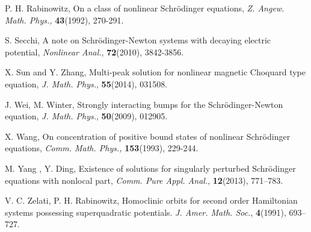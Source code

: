 \documentclass[12pt,reqno]{amsart}
\numberwithin{equation}{section}
\begin{document}
\begin{thebibliography}{100}
 P. H. Rabinowitz, On a class of nonlinear Schr\"{o}dinger equations, {\it Z. Angew. Math. Phys., } {\bf 43}(1992), 270-291.

 S. Secchi, A note on Schr\"{o}dinger-Newton systems with decaying electric potential, {\it Nonlinear Anal.}, {\bf72}(2010), 3842-3856.

 X. Sun and Y. Zhang, Multi-peak solution for nonlinear magnetic Choquard type equation, {\it J. Math. Phys.}, {\bf55}(2014), 031508.

 J. Wei, M. Winter, Strongly interacting bumps for the Schr\"{o}dinger-Newton equation, {\it J. Math. Phys.}, {\bf50}(2009), 012905.

 X. Wang, On concentration of positive bound states of nonlinear Schr\"{o}dinger equations, {\it Comm. Math. Phys., } {\bf 153}(1993), 229-244.

 M. Yang , Y. Ding, Existence of solutions for singularly perturbed Schr\"odinger equations with nonlocal part, {\it Comm. Pure Appl. Anal.},
{\bf12}(2013), 771--783.

 V. C. Zelati, P. H. Rabinowitz, Homoclinic orbits for second order Hamiltonian systems possessing superquadratic potentials. {\it J. Amer. Math. Soc.}, {\bf4}(1991), 693--727.

\end{thebibliography}
\end{document}
